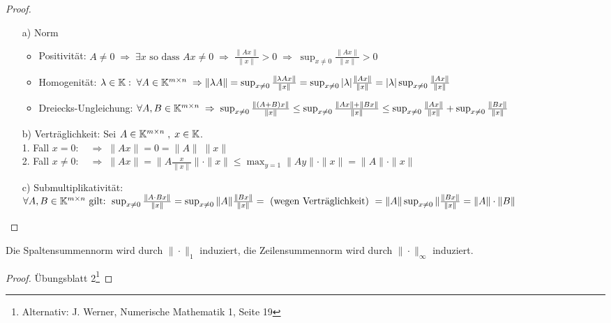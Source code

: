 \begin{proof}
\begin{enumerate}
  \item [a)] Norm
    \begin{itemize}
      \item Positivität: $A \ne 0 \; \Rightarrow \; \exists x \text{ so dass }
    A x \ne 0 \; \Rightarrow \; \frac{\| A x \|}{\| x \|} > 0
    \; \Rightarrow \;  \sup_{ x\ne 0} \frac{\| A x \|}{\| x \|} > 0$
      \item Homogenität: $\lambda \in \mathbb K:\; \forall A \in \mathbb K^{m \times n} \;
      \Rightarrow \| \lambda A \| = \sup_{ x\ne 0} \frac{\| \lambda A x \|}{\| x \|} =
      \sup_{ x\ne 0} |\lambda|  \frac{\| A x \|}{\| x \|} =
      |\lambda| \sup_{ x\ne 0} \frac{\| A x \|}{\| x \|}$
      \item Dreiecks-Ungleichung: $\forall A, B  \in \mathbb K^{m \times n} \; \Rightarrow \;
      \sup_{ x\ne 0} \frac{\| (A + B) x \|}{\| x \|} \le
      \sup_{ x\ne 0} \frac{\| A x \| + \| B x \|}{\| x \|} \le
      \sup_{ x\ne 0} \frac{\| A x \|}{\| x \|} + \sup_{ x\ne 0} \frac{\| B x \|}{\| x \|}$
    \end{itemize}
  \item [b)] Verträglichkeit: Sei $A \in \mathbb K^{m \times n} \; , \; x \in \mathbb K$.\\
    1. Fall $x = 0  : \quad \Rightarrow \; \| A x \| = 0 = \|A \| \; \|x\| $\\
    2. Fall $x \ne 0  : \quad \Rightarrow \; \| A x \| =
    \| A \frac{x}{\|x\|}\| \cdot \| x \| \le
    \max_{y = 1} \| A y \| \cdot \| x \| = \| A \| \cdot \| x \|$
  \item [c)] Submultiplikativität: $\forall A, B  \in \mathbb K^{m \times n} \text{ gilt: }
  \sup_{ x\ne 0} \frac{\| A \cdot B x \|}{\| x \|} =
  \sup_{ x\ne 0} \| A \| \frac{\| B x \|}{\| x \|} = \\
  \text{ (wegen Verträglichkeit) } = \| A \|  \sup_{ x\ne 0}  \| \frac{\| B x \|}{\| x \|}
  = \|A\| \cdot \|B\|$
\end{enumerate}
\end{proof}


\begin{Satz}
  Die Spaltensummennorm wird durch $\| \cdot \|_1$ induziert, die Zeilensummennorm
  wird durch $\| \cdot \|_\infty$ induziert.
\end{Satz}
\begin{proof}  Übungsblatt 2\footnote{Alternativ: J. Werner, Numerische Mathematik 1, Seite 19} \end{proof}

